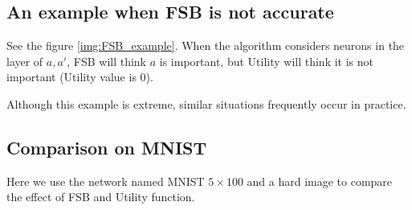 	
\iffalse
\begin{figure}[t!]
\begin{tikzpicture}[scale=1, >=stealth]
	
	\draw[->] (-5,0) -- (4,0) node[right] {$b$};
	\draw[->] (0,-1) -- (0,3) node[above] {$\hat{b}$};
	
	\draw[line width=0.4mm, blue] (-3,0) -- (0,0);
	\draw[thick, blue] (0,0) -- (2.5,2.5) node[below, shift={(-1.1,-1.9)}] {$\hat{b} = \ReLU(b)$};
	\draw[thick, blue] (-3,0) -- (2.5,2.5) node[above, shift={(-6.5,-2)}] {$\hat{b} = \frac{\UB}{\UB-\LB} b-\frac{\UB\cdot\LB}{\UB-\LB}$};
	
	\draw[dashed] (2.5,0) -- (2.5,2.5) -- (0,2.5); %
	\node[below left] at (0,0) {$0$};
	
	
	\foreach \x in {2.5}
	\draw[shift={(\x,0)}] (0,0.1) -- (0,-0.1) node[below] {$\UB$};
	\foreach \x in {-3}
	\draw[shift={(\x,0)}] (0,0.1) -- (0,-0.1) node[below] {$\LB$};

	\foreach \y in {2.5}
	\draw[shift={(0,\y)}] (0.1,0) -- (-0.1,0) node[left] {$\UB$};
	
	\draw (-1,0.1) -- (-1,-0.1) node[below] {$\sol(b)$};
	\draw[dashed] (-1,0) -- (-1,0.9) -- (0,0.9);
	\draw (-0.1,0.9) -- (0.1,0.9) node[right, shift={(-0.1,0.13)}] {$\sol(\hat{b})$};
	\node at (-0.5,0.4) {$\Delta(b)$};
	
\end{tikzpicture}
	\caption{}
\label{img:Utility}
\end{figure}
\fi


\iffalse
\subsection*{An example when FSB is not accurate}

See the figure \ref{img:FSB_example}. When the algorithm considers neurons in the layer of $a,a'$, FSB will think $a$ is important, but Utility will think it is not important (Utility value is 0).

Although this example is extreme, similar situations frequently occur in practice.

\subsection*{Comparison on MNIST}

Here we use the network named MNIST $5\times 100$ and a hard image to compare the effect of FSB and Utility function. 

